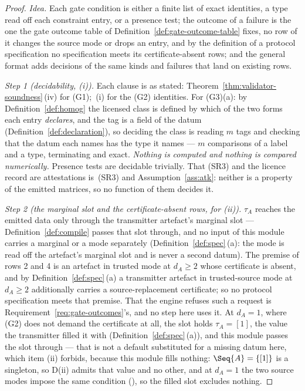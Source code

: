 \begin{proof}
\emph{Idea.} Each gate condition is either a finite list of exact identities,
a type read off each constraint entry, or a presence test; the outcome of a
failure is the one the gate outcome table of
Definition~\ref{def:gate-outcome-table} fixes, no row of it changes the
source mode or drops an entry, and by the definition of a protocol
specification no specification meets its certificate-absent rows; and
the general format adds decisions of the same kinds and failures that land on
existing rows.

\emph{Step 1 (decidability, (i)).} Each clause is as stated:
Theorem~\ref{thm:validator-soundness}\,(iv) for (G1);
\,(i) for the (G2) identities.
For (G3)(a): by Definition~\ref{def:homog} the licensed class is defined by
which of the two forms each entry \emph{declares}, and the tag is a field of
the datum (Definition~\ref{def:declaration}), so deciding the class is reading
$m$ tags and checking that the datum each names has the type it names --- $m$
comparisons of a label and a type, terminating and exact. \emph{Nothing is
computed and nothing is compared numerically.} Presence tests are decidable
trivially. That (SR3) and the licence record are attestations is
\,(SR3) and Assumption~\ref{ass:atk}: neither is
a property of the emitted matrices, so no function of them decides it.

\emph{Step 2 (the marginal slot and the certificate-absent rows, for (ii)).}
$\tau_A$ reaches the emitted
data only through the transmitter artefact's marginal slot ---
Definition~\ref{def:compile} passes that slot through, and no input of this
module carries a marginal or a mode separately (Definition~\ref{def:spec}\,(a):
the mode is read off the artefact's marginal slot and is never a second
datum). The premise of
rows 2 and 4 is an artefact in trusted mode at $d_A\ge2$ whose certificate is
absent, and by Definition~\ref{def:spec}\,(a) a transmitter artefact in
trusted-source mode at $d_A\ge2$ additionally carries a source-replacement
certificate; so no protocol specification meets that premise. That the engine
refuses such a request is Requirement~\ref{req:gate-outcomes}'s, and no step
here uses it. At
$d_A=1$, where (G2) does not demand the certificate at all, the slot holds
$\tau_A=[1]$, the value the transmitter filled it with
(Definition~\ref{def:spec}\,(a)), and this
module passes the slot through --- that is not a default substituted for a
missing datum here, which item (ii) forbids, because this module fills
nothing: $\Seq{A}=\{[1]\}$ is a singleton, so D(ii) admits that value and no
other, and at $d_A=1$ the two source modes impose the same condition
(), so the filled slot excludes nothing.


\end{proof}
